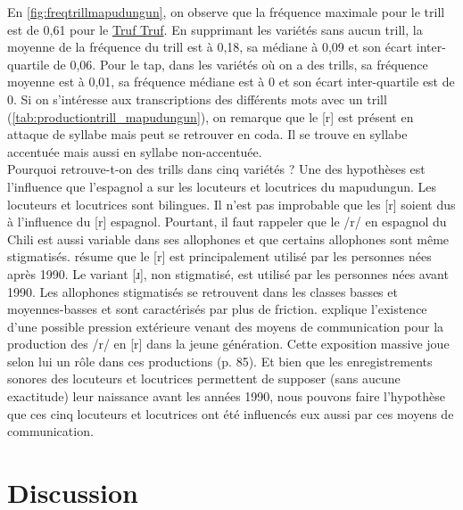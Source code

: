 En \autoref{fig:freqtrillmapudungun}, on observe que la fréquence maximale pour le trill est de 0,61 pour le \href{https://soundcomparisons.com/#/en/Mapudungun/language/Mpg_Chl_Rgn9_TrufTruf_Danquilco}{Truf Truf}.
En supprimant les variétés sans aucun trill, la moyenne de la fréquence du trill est à 0,18, sa médiane à 0,09 et son écart inter-quartile de 0,06.
Pour le tap, dans les variétés où on a des trills, sa fréquence moyenne est à 0,01, sa fréquence médiane est à 0 et son écart inter-quartile est de 0.
Si on s'intéresse aux transcriptions des différents mots avec un trill (\autoref{tab:productiontrill_mapudungun}), on remarque que le [r] est présent en attaque de syllabe mais peut se retrouver en coda. Il se trouve en syllabe accentuée mais aussi en syllabe non-accentuée.\\

Pourquoi retrouve-t-on des trills dans cinq variétés ?
Une des hypothèses est l'influence que l'espagnol a sur les locuteurs et locutrices du mapudungun. Les locuteurs et locutrices sont bilingues. Il n'est pas improbable que les [r] soient dus à l'influence du [r] espagnol. Pourtant, il faut rappeler que le /r/ en espagnol du Chili est aussi variable dans ses allophones et que certains allophones sont même stigmatisés. \textcite{sadowskyVariacionSociofoneticaConsonantes2015} résume que le [r] est principalement utilisé par les personnes nées après 1990. Le variant [ɹ], non stigmatisé, est utilisé par  les personnes nées avant 1990. Les allophones stigmatisés se retrouvent dans les classes basses et moyennes-basses et sont caractérisés par plus de friction. \citeauthor{sadowskyVariacionSociofoneticaConsonantes2015} explique l'existence d'une possible pression extérieure venant des moyens de communication pour la production des /r/ en [r] dans la jeune génération. Cette exposition massive joue selon lui un rôle dans ces productions (p. 85).
Et bien que les enregistrements sonores des locuteurs et locutrices permettent de supposer (sans aucune exactitude) leur naissance avant les années 1990, nous pouvons faire l'hypothèse que ces cinq locuteurs et locutrices ont été influencés eux aussi par ces moyens de communication.


\section{Discussion}

